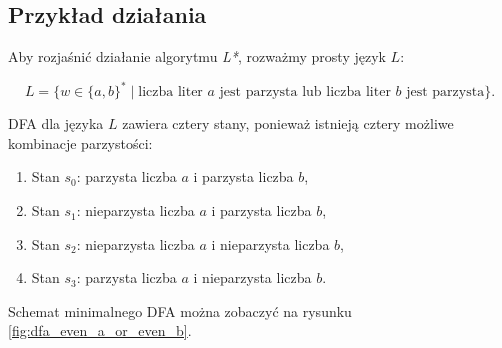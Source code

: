 

\subsection{Przykład działania}

Aby rozjaśnić działanie algorytmu \textit{L*}, rozważmy prosty język $L$:

\[
L = \{ w \in \{a, b\}^* \mid \text{liczba liter } a \text{ jest parzysta lub liczba liter } b \text{ jest parzysta} \}.
\]

DFA dla języka $L$ zawiera cztery stany, ponieważ istnieją cztery możliwe kombinacje parzystości:
\begin{enumerate}
    \item Stan $s_0$: parzysta liczba $a$ i parzysta liczba $b$,
    \item Stan $s_1$: nieparzysta liczba $a$ i parzysta liczba $b$,
    \item Stan $s_2$: nieparzysta liczba $a$ i nieparzysta liczba $b$,
    \item Stan $s_3$: parzysta liczba $a$ i nieparzysta liczba $b$.
\end{enumerate}

Schemat minimalnego DFA można zobaczyć na rysunku \ref{fig:dfa_even_a_or_even_b}.

